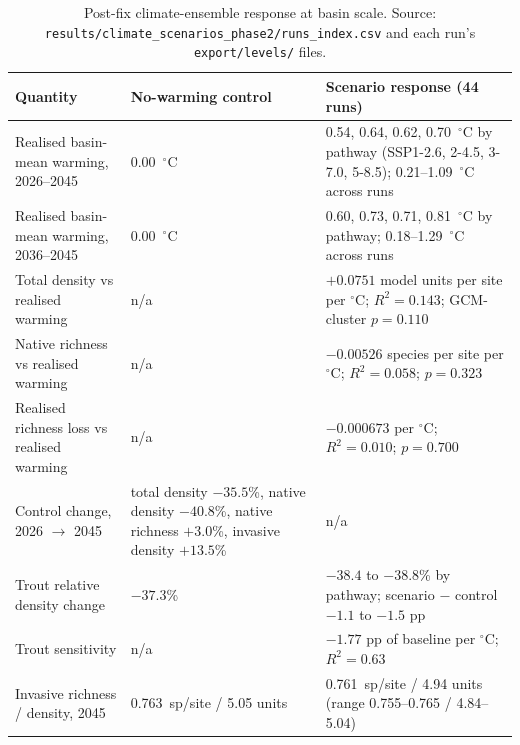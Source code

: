 \documentclass[11pt,a4paper]{article}
\begin{document}
\begin{table}[H]
\centering
\caption{Post-fix climate-ensemble response at basin scale. Source: \texttt{results/climate\_scenarios\_phase2/runs\_index.csv} and each run's \texttt{export/levels/} files.}
\label{tab:climate}
\small
\begin{tabularx}{\textwidth}{>{\raggedright\arraybackslash}p{}YY}
\toprule
Quantity & No-warming control & Scenario response (44 runs) \\
\midrule
Realised basin-mean warming, 2026--2045 & 0.00~$^\circ$C & 0.54, 0.64, 0.62, 0.70~$^\circ$C by pathway (SSP1-2.6, 2-4.5, 3-7.0, 5-8.5); 0.21--1.09~$^\circ$C across runs \\
Realised basin-mean warming, 2036--2045 & 0.00~$^\circ$C & 0.60, 0.73, 0.71, 0.81~$^\circ$C by pathway; 0.18--1.29~$^\circ$C across runs \\
Total density vs realised warming & n/a & $+0.0751$ model units per site per $^\circ$C; $R^2=0.143$; GCM-cluster $p=0.110$ \\
Native richness vs realised warming & n/a & $-0.00526$ species per site per $^\circ$C; $R^2=0.058$; $p=0.323$ \\
Realised richness loss vs realised warming & n/a & $-0.000673$ per $^\circ$C; $R^2=0.010$; $p=0.700$ \\
Control change, 2026 $\rightarrow$ 2045 & total density $-35.5$\%, native density $-40.8$\%, native richness $+3.0$\%, invasive density $+13.5$\% & n/a \\
Trout relative density change & $-37.3$\% & $-38.4$ to $-38.8$\% by pathway; scenario $-$ control $-1.1$ to $-1.5$ pp \\
Trout sensitivity & n/a & $-1.77$ pp of baseline per $^\circ$C; $R^2=0.63$ \\
Invasive richness / density, 2045 & 0.763~sp/site / 5.05 units & 0.761~sp/site / 4.94 units (range 0.755--0.765 / 4.84--5.04) \\
\bottomrule
\end{tabularx}
\end{table}
\end{document}
